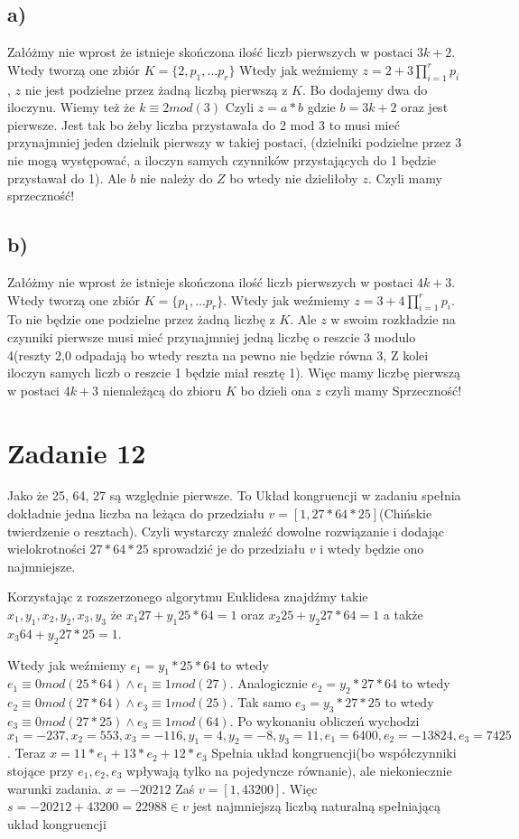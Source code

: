 \documentclass{article}
\begin{document}
\subsection*{a)}
Załóżmy nie wprost że istnieje skończona ilość liczb pierwszych w postaci $3k + 2$. Wtedy tworzą one zbiór
$K = \{ 2, p_1, ... p_r \}$ Wtedy jak weźmiemy $z =2 + 3 \prod_{i=1}^{r} p_i$, $z$ nie jest podzielne przez żadną liczbą pierwszą z $K$. Bo dodajemy dwa do iloczynu. Wiemy też że $k \equiv 2 mod(3)$ Czyli $z = a * b$ gdzie $b = 3k + 2$ oraz jest pierwsze. Jest tak bo żeby liczba przystawała do 2 mod 3 to musi mieć przynajmniej jeden dzielnik pierwszy w takiej postaci, (dzielniki podzielne przez 3 nie mogą występować, a iloczyn samych czynników przystających do 1 będzie przystawał do 1). Ale $b$ nie należy do $Z$ bo wtedy nie dzieliłoby $z$. Czyli mamy sprzeczność!

\subsection*{b)}
Załóżmy nie wprost że istnieje skończona ilość liczb pierwszych w postaci $4k + 3$. Wtedy tworzą one zbiór
$K = \{ p_1, ... p_r \}$. Wtedy jak weźmiemy $z = 3 + 4\prod_{i=1}^r p_i$. To nie będzie one podzielne przez żadną liczbę z $K$. Ale $z$ w swoim rozkładzie na czynniki pierwsze musi mieć przynajmniej jedną liczbę o reszcie 3 modulo 4(reszty 2,0 odpadają bo wtedy reszta na pewno nie będzie równa 3, Z kolei iloczyn samych liczb o reszcie 1 będzie miał resztę 1). Więc mamy liczbę pierwszą w postaci $4k + 3$ nienależącą do zbioru $K$ bo dzieli ona $z$ czyli mamy Sprzeczność!

\section*{Zadanie 12}
Jako że 25, 64, 27 są względnie pierwsze. To Układ kongruencji w zadaniu spełnia dokładnie jedna liczba na leżąca do przedziału $v =[1, 27 * 64 * 25]$(Chińskie twierdzenie o resztach). Czyli wystarczy znaleźć dowolne rozwiązanie i dodając wielokrotności $27*64*25$ sprowadzić je do przedziału $v$ i wtedy będzie ono najmniejsze.

Korzystając z rozszerzonego algorytmu Euklidesa znajdźmy takie $x_1, y_1, x_2, y_2, x_3, y_3$ że $x_1 27 + y_1 25*64 = 1$ oraz $x_2 25 + y_2 27*64 = 1$ a także $x_3 64 + y_2 27*25 = 1$.  

Wtedy jak weźmiemy $e_1 = y_1 * 25*64$ to wtedy $e_1 \equiv 0 mod(25*64) \land e_1 \equiv 1 mod(27)$. 
Analogicznie $e_2 = y_2 * 27*64$ to wtedy $e_2 \equiv 0 mod(27*64) \land e_3 \equiv 1 mod(25)$. 
Tak samo $e_3 = y_3 * 27*25$ to wtedy $e_3 \equiv 0 mod(27*25) \land e_3 \equiv 1 mod(64)$. Po wykonaniu obliczeń wychodzi $x_1 = -237, x_2 = 553, x_3 = -116, y_1 = 4, y_2 = -8, y_3 = 11, e_1 = 6400, e_2 = -13824, e_3 = 7425$.
Teraz $x = 11 * e_1 + 13 * e_2 + 12 * e_3$ Spełnia układ kongruencji(bo współczynniki stojące przy $e_1, e_2, e_3$ wpływają tylko na pojedyncze równanie), ale niekoniecznie warunki zadania. $x = -20212$ Zaś $v = [1, 43200]$. Więc $s  = -20212 + 43200 = 22988 \in v$ jest najmniejszą liczbą naturalną spełniającą układ kongruencji
\end{document}

